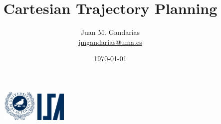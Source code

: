 \documentclass[10pt, aspectratio=169]{beamer}
\title[\href{https://jmgandarias.com}{\textcolor{white}{jmgandarias.com}}]{Cartesian Trajectory Planning}
\theoremstyle{remark}
\theoremstyle{definition}
\begin{document}
\author[Systems Engineering and Automation]{
	\large
	Juan M. Gandarias\\
    \footnotesize \href{mailto:jmgandarias@uma.es}{jmgandarias@uma.es}
}



\date{\today}

\begin{noheadline}
\begin{frame}
    \maketitle
    \vspace{-1cm}
    \begin{figure}
		\centering
		\includegraphics[height=1.5cm]{./style_files_uma/logo_uma}
        \hspace{10cm}
        \includegraphics[height=1.4cm]{./style_files_uma/logo_isa}
	\end{figure}
 \end{frame}
\end{noheadline}
\end{document}
